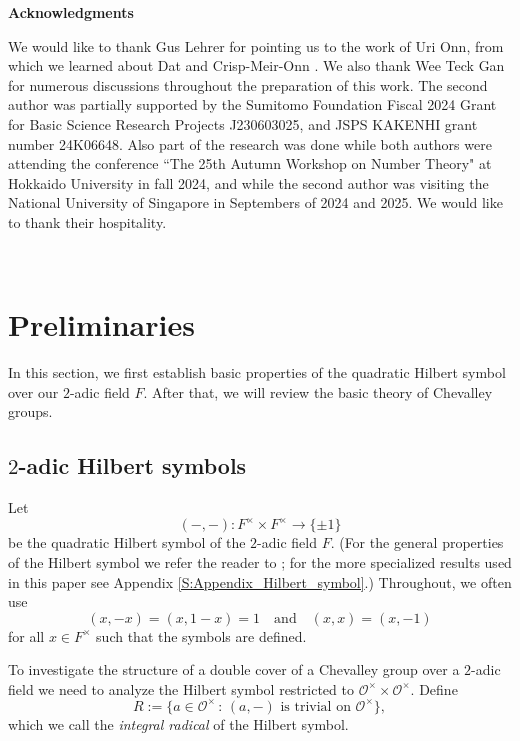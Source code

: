 \documentclass[10pt, letterpaper]{amsart}
\theoremstyle{plain}
\theoremstyle{definition}
\numberwithin{equation}{section}
\newcommand{\Ocal}{\mathcal{O}}
\newcommand{\st}{\,:\,}
\newcommand{\qand}{{\quad\text{and}\quad}}
\begin{document}
\quad


\begin{center}{\bf Acknowledgments}\end{center}
We would like to thank Gus Lehrer for pointing us to the work of Uri Onn, from which we learned about Dat \cite{D09} and Crisp-Meir-Onn \cite{CMO19}. We also thank Wee Teck Gan for numerous discussions throughout the preparation of this work. The second author was partially supported by the Sumitomo Foundation Fiscal 2024 Grant for Basic Science Research Projects J230603025, and  JSPS KAKENHI grant number 24K06648. Also part of the research was done while both authors were attending the conference ``The 25th Autumn Workshop on Number Theory" at Hokkaido University in fall 2024, and while the second author was visiting the National University of Singapore in Septembers of 2024 and 2025. We would like to thank their hospitality.



\quad\\




\section{Preliminaries}\label{S:Prelim}


In this section, we first establish basic properties of the quadratic Hilbert symbol over our $2$-adic field $F$. After that, we will review the basic theory of Chevalley groups.

\subsection{$2$-adic Hilbert symbols}\label{SS:HilbSymb}
Let
\[
(-,-):F^\times\times F^\times\longrightarrow \{\pm 1\}
\]
be the quadratic Hilbert symbol of the $2$-adic field $F$. (For the general properties of the Hilbert symbol we refer the reader to \cite[Chapter V \S 3]{Neukirch}; for the more specialized results used in this paper see Appendix \ref{S:Appendix_Hilbert_symbol}.) Throughout, we often use
\[
(x, -x)=(x, 1-x)=1\qand (x, x)=(x, -1)
\]
for all $x\in F^\times$ such that the symbols are defined.

To investigate the structure of a double cover of a Chevalley group over a $2$-adic field we need to analyze the Hilbert symbol restricted to $\Ocal^\times\times\Ocal^\times$. Define
\begin{equation}\label{E:integral_radical_def}
R:=\{a\in\Ocal^\times\st \text{$(a, -)$ is trivial on $\Ocal^\times$}\},
\end{equation}
which we call the {\it integral radical} of the Hilbert symbol. 
\end{document}
